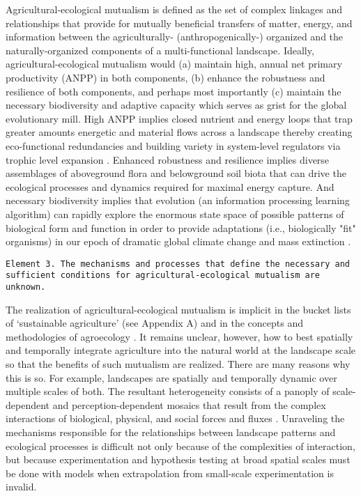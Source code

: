 Agricultural-ecological mutualism is defined as the set of complex linkages and relationships that provide for mutually beneficial transfers of matter, energy, and information between the agriculturally- (anthropogenically-) organized and the naturally-organized components of a multi-functional landscape. Ideally, agricultural-ecological mutualism would (a) maintain high, annual net primary productivity (ANPP) in both components, (b) enhance the robustness and resilience of both components, and perhaps most importantly (c) maintain the necessary biodiversity and adaptive capacity which serves as grist for the global evolutionary mill.  High ANPP implies closed nutrient and energy loops that trap greater amounts energetic and material flows across a landscape thereby creating eco-functional redundancies and building variety in system-level regulators via trophic level expansion \citep{ashby_introduction_1955}. Enhanced robustness and resilience implies diverse assemblages of aboveground flora and belowground soil biota that can drive the ecological processes and dynamics required for maximal energy capture. And necessary biodiversity implies that evolution (an information processing learning algorithm) can rapidly explore the enormous state space of possible patterns of biological form and function in order to provide adaptations (i.e., biologically "fit" organisms) in our epoch of dramatic global climate change and mass extinction \citep{ceballos_accelerated_2015}.\\

\begin{sloppypar}
\texttt{Element 3. The mechanisms and processes that define the necessary and sufficient conditions for agricultural-ecological mutualism are unknown.}\\
\end{sloppypar}

The realization of agricultural-ecological mutualism is implicit in the bucket lists of \enquote*{sustainable agriculture} (see Appendix A) and in the concepts and methodologies of agroecology \citep{gliessman_agroecology:_2015}. It remains unclear, however, how to best spatially and temporally integrate agriculture into the natural world at the landscape scale so that the benefits of such mutualism are realized. There are many reasons why this is so. For example, landscapes are spatially and temporally dynamic over multiple scales of both. The resultant heterogeneity consists of a panoply of scale-dependent and perception-dependent mosaics that result from the complex interactions of biological, physical, and social forces and fluxes \citep{turner_landscape_1989}. Unraveling the mechanisms responsible for the relationships between landscape patterns and ecological processes is difficult not only because of the complexities of interaction, but because experimentation and hypothesis testing at broad spatial scales must be done with models when extrapolation from small-scale experimentation is invalid. \\

